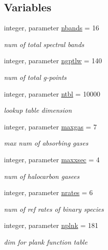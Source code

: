\subsection*{Variables}
\begin{DoxyCompactItemize}
\item 
integer, parameter \hyperlink{group__module__radlw__main_ga48e11b992a80595d71c92f7c9bfbe19c}{nbands} = 16
\begin{DoxyCompactList}\small\item\em num of total spectral bands \end{DoxyCompactList}\item 
integer, parameter \hyperlink{group__module__radlw__main_ga05fe17fe932ce62a3ae2c6c564584321}{ngptlw} = 140
\begin{DoxyCompactList}\small\item\em num of total g-\/points \end{DoxyCompactList}\item 
integer, parameter \hyperlink{group__module__radlw__main_ga61ae33b9db5bac9962f72e2a0db3c0e4}{ntbl} = 10000
\begin{DoxyCompactList}\small\item\em lookup table dimension \end{DoxyCompactList}\item 
integer, parameter \hyperlink{group__module__radlw__main_ga01330b4ad09907f2db51cb516ed21033}{maxgas} = 7
\begin{DoxyCompactList}\small\item\em max num of absorbing gases \end{DoxyCompactList}\item 
integer, parameter \hyperlink{group__module__radlw__main_ga5817221936731c6ee6443da6a64e934e}{maxxsec} = 4
\begin{DoxyCompactList}\small\item\em num of halocarbon gasees \end{DoxyCompactList}\item 
integer, parameter \hyperlink{group__module__radlw__main_ga86288e4bbe3d6962505488790ff42bfa}{nrates} = 6
\begin{DoxyCompactList}\small\item\em num of ref rates of binary species \end{DoxyCompactList}\item 
integer, parameter \hyperlink{group__module__radlw__main_ga7ade2de4de94ec6e7a0e97321143e2e6}{nplnk} = 181
\begin{DoxyCompactList}\small\item\em dim for plank function table \end{DoxyCompactList}\item 

\end{DoxyCompactItemize}

